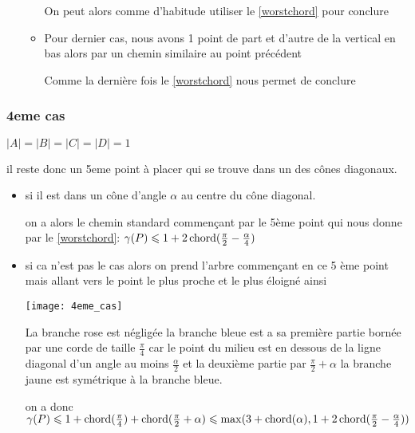 \begin{itemize}
\begin{itemize}
On peut alors comme d'habitude utiliser le \cref{worstchord} pour conclure

\item \label{3cas23} Pour dernier cas, nous avons 1 point de part et d'autre de
  la vertical en bas alors par un chemin similaire au point précédent 


Comme la dernière fois le \cref{worstchord} nous permet de conclure

\end{itemize}
\end{itemize}

\subsubsection*{4eme cas}\label{4cas} $|A| = |B| = |C| = |D| = 1$

il reste donc un 5eme point à placer qui se trouve dans un des cônes diagonaux.

\begin{itemize}

\item \label{4cas1} si il est dans un cône d'angle $\alpha$ au centre du cône diagonal.

on a alors le chemin standard commençant par le 5ème point qui nous donne par le \cref{worstchord}: $\gamma(P) \leqslant 1 + 2\operatorname{chord}(\frac{\pi}{2} - \frac{\alpha}{4})$

\item \label{4cas2} si ca n'est pas le cas alors on prend l'arbre commençant en ce 5 ème point mais allant vers le point le plus proche et le plus éloigné ainsi

  \texttt{[image: 4eme\_cas]}

La branche rose est négligée
la branche bleue est a sa première partie bornée par une corde de taille $\frac{\pi}{4}$ car le point du milieu est en dessous de la ligne diagonal d'un angle au moins $\frac{\alpha}{2}$ et la deuxième partie par $\frac{\pi}{2} + \alpha$
la branche jaune est symétrique à la branche bleue.

on a donc $\gamma(P) \leqslant 1 + \operatorname{chord}(\frac{\pi}{4}) + \operatorname{chord}(\frac{\pi}{2} + \alpha) \leqslant \max(3 + \operatorname{chord}(\alpha), 1 + 2\operatorname{chord}(\frac{\pi}{2} - \frac{\alpha}{4}))$

\end{itemize}


